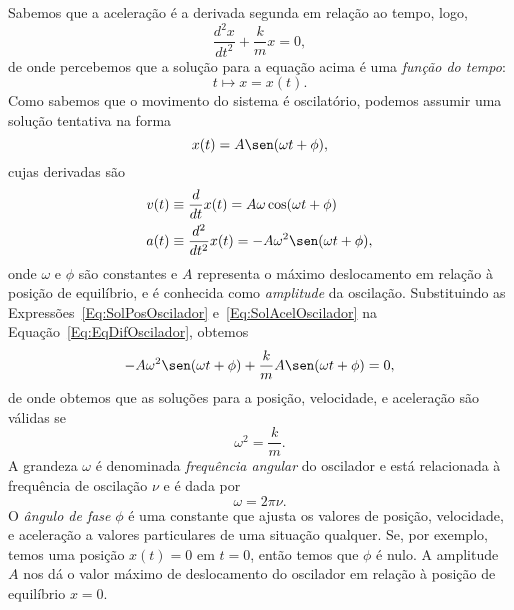 Sabemos que a aceleração é a derivada segunda em relação ao tempo, logo,
\begin{equation}\label{Eq:EqDifOscilador}
    \frac{d^2x}{dt^2} + \frac{k}{m} x = 0,
\end{equation}
%
de onde percebemos que a solução para a equação acima é uma \emph{função do tempo}:
\begin{equation}
    t \mapsto x = x(t).
\end{equation}
%
Como sabemos que o movimento do sistema é oscilatório, podemos assumir uma solução tentativa na forma
\begin{equation}\label{Eq:SolPosOscilador}
    x(t) = A \sen(\omega t + \phi),
\end{equation}
%
cujas derivadas são
\begin{align}
    v(t) &\equiv \frac{d}{dt} x(t) = A \omega \cos(\omega t + \phi) \\
    a(t) &\equiv \frac{d^2}{dt^2} x(t) = -A \omega^2 \sen(\omega t + \phi), \label{Eq:SolAcelOscilador}
\end{align}
%
onde $\omega$ e $\phi$ são constantes e $A$ representa o máximo deslocamento em relação à posição de equilíbrio, e é conhecida como \emph{amplitude} da oscilação. Substituindo as Expressões~\eqref{Eq:SolPosOscilador} e~\eqref{Eq:SolAcelOscilador} na Equação~\eqref{Eq:EqDifOscilador}, obtemos
\begin{equation}
    -A \omega^2 \sen(\omega t + \phi) + \frac{k}{m} A \sen(\omega t + \phi) = 0,
\end{equation}
%
de onde obtemos que as soluções para a posição, velocidade, e aceleração são válidas se
\begin{equation}
    \omega^2 = \frac{k}{m}. \label{Eq:FrequenciaAngular}
\end{equation}
%
A grandeza $\omega$ é denominada \emph{frequência angular} do oscilador e está relacionada à frequência de oscilação $\nu$ e é dada por
\begin{equation}
    \omega = 2\pi\nu.
\end{equation}
%
O \emph{ângulo de fase} $\phi$ é uma constante que ajusta os valores de posição, velocidade, e aceleração a valores particulares de uma situação qualquer. Se, por exemplo, temos uma posição $x(t) = 0$ em $t = 0$, então temos que $\phi$ é nulo. A amplitude $A$ nos dá o valor máximo de deslocamento do oscilador em relação à posição de equilíbrio $x = 0$.

